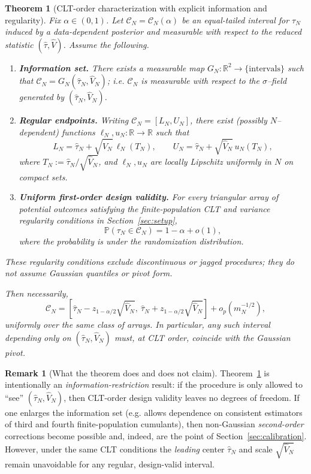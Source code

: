 \documentclass[aos]{imsart}
\newtheorem{theorem}{Theorem}
\theoremstyle{definition}
\newtheorem{remark}{Remark}
\theoremstyle{plain}
\newcommand{\Prb}{\mathbb{P}}
\newcommand{\mN}{m_N}
\newcommand{\R}{\mathbb{R}}
\newcommand{\tauN}{\hat{\tau}_N}
\newcommand{\VN}{\hat V_N}
\begin{document}
\begin{theorem}[CLT-order characterization with explicit information and regularity]\label{thm:clt_characterization}
Fix $\alpha\in(0,1)$.  Let $\mathcal{C}_N=\mathcal{C}_N(\alpha)$ be an equal-tailed interval for $\tau_N$ induced by a data-dependent posterior and measurable with respect to the reduced statistic $(\hat\tau,\hat V)$.
Assume the following.

\begin{enumerate}[label=(A\arabic*),leftmargin=*,itemsep=2pt]
\item \textbf{Information set.}  There exists a measurable map $G_N:\R^2\to\{\text{intervals}\}$ such that
$\mathcal{C}_N = G_N(\tauN,\VN)$; i.e. $\mathcal{C}_N$ is measurable with respect to the
$\sigma$--field generated by $(\tauN,\VN)$.
\item \textbf{Regular endpoints.}  Writing $\mathcal{C}_N=[L_N,U_N]$, there exist (possibly $N$--dependent)
functions $\ell_N,u_N:\R\to\R$ such that
\[
L_N=\tauN+\sqrt{\VN}\,\ell_N(T_N),\qquad U_N=\tauN+\sqrt{\VN}\,u_N(T_N),
\]
where $T_N:=\tauN/\sqrt{\VN}$, and $\ell_N,u_N$ are locally Lipschitz uniformly in $N$
on compact sets.
\item \textbf{Uniform first-order design validity.}  For every triangular array of potential outcomes satisfying the
finite-population CLT and variance regularity conditions in Section~\ref{sec:setup},
\[
\Prb\!\left(\tau_N\in\mathcal{C}_N\right)=1-\alpha+o(1),
\]
where the probability is under the randomization distribution.
\end{enumerate}
These regularity conditions exclude discontinuous or jagged procedures; they do not assume Gaussian quantiles or pivot form.

Then necessarily,
\[
\mathcal{C}_N
=
\left[\tauN - z_{1-\alpha/2}\sqrt{\VN},\ \tauN + z_{1-\alpha/2}\sqrt{\VN}\right]
+ o_p(\mN^{-1/2}),
\]
uniformly over the same class of arrays.  In particular, any such interval depending only on $(\tauN,\VN)$
must, at CLT order, coincide with the Gaussian pivot.
\end{theorem}

\begin{remark}[What the theorem does and does not claim]\label{rem:info_set}
Theorem~\ref{thm:clt_characterization} is intentionally an \emph{information-restriction} result:
if the procedure is only allowed to ``see'' $(\tauN,\VN)$, then CLT-order design validity leaves no degrees of freedom.
If one enlarges the information set (e.g. allows dependence on consistent estimators of third and fourth
finite-population cumulants), then non-Gaussian \emph{second-order} corrections become possible and, indeed,
are the point of Section~\ref{sec:calibration}.  However, under the same CLT conditions the \emph{leading}
center $\tauN$ and scale $\sqrt{\VN}$ remain unavoidable for any regular, design-valid interval.
\end{remark}
\end{document}
